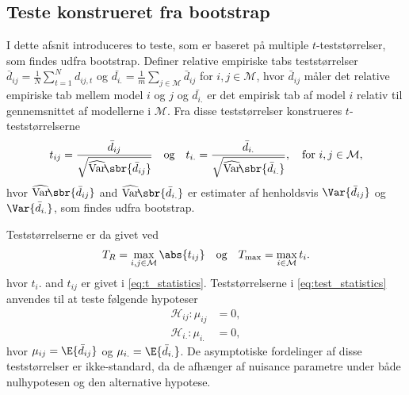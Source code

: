 \subsection{Teste konstrueret fra bootstrap}
I dette afsnit introduceres to teste, som er baseret på multiple \(t\)-teststørrelser, som findes udfra bootstrap.
Definer relative empiriske tabs teststørrelser \(\bar{d}_{ij} = \frac{1}{N} \sum_{t = 1}^N d_{ij,t}\) og \(\bar{d_{i.}} = \frac{1}{m} \sum_{j \in \mathcal{M}} \bar{d}_{ij}\) for \(i,j \in \mathcal{M}\), hvor \(\bar{d}_{ij}\) måler det relative empiriske tab mellem model \(i\) og \(j\) og \(\bar{d_{i.}}\) er det empirisk tab af model \(i\) relativ til gennemsnittet af modellerne i \(\mathcal{M}\). 
Fra disse teststørrelser konstrueres \(t\)-teststørrelserne
\begin{align}
t_{ij} = \frac{\bar{d}_{ij}}{\sqrt{\widehat{\mathrm{Var}}\!\sbr{\bar{d}_{ij}}}} \quad \text{og} \quad t_{i.} = \frac{\bar{d}_{i.}}{\sqrt{\widehat{\mathrm{Var}}\!\sbr{\bar{d}_{i.}}}}, \quad \text{for } i,j \in \mathcal{M}, \label{eq:t_statistics}
\end{align}
hvor \(\widehat{\mathrm{Var}}\!\sbr{\bar{d}_{ij}}\) and \(\widehat{\mathrm{Var}}\!\sbr{\bar{d}_{i.}}\) er estimater af henholdsvis \(\Var{\bar{d}_{ij}}\) og \(\Var{\bar{d}_{i.}}\), som findes udfra bootstrap.

Teststørrelserne er da givet ved
\begin{align} 
T_R = \max_{i,j \in \mathcal{M}} \abs{t_{ij}} \quad \text{og} \quad T_{\text{max}} = \max_{i \in \mathcal{M}} t_i. \label{eq:test_statistics}
\end{align}
hvor \(t_i.\) and \(t_{ij}\) er givet i \eqref{eq:t_statistics}.
Teststørrelserne i \eqref{eq:test_statistics} anvendes til at teste følgende hypoteser
\begin{align*}
\mathcal{H}_{ij}:\mu_{ij}&=0, \\
\mathcal{H}_{i.} : \mu_{i.}&=0,
\end{align*}
hvor \(\mu_{ij} = \E{\bar{d}_{ij}}\) og \(\mu_{i.} = \E{\bar{d}_{i.}}\).
De asymptotiske fordelinger af disse teststørrelser er ikke-standard, da de afhænger af nuisance parametre under både nulhypotesen og den alternative hypotese.
